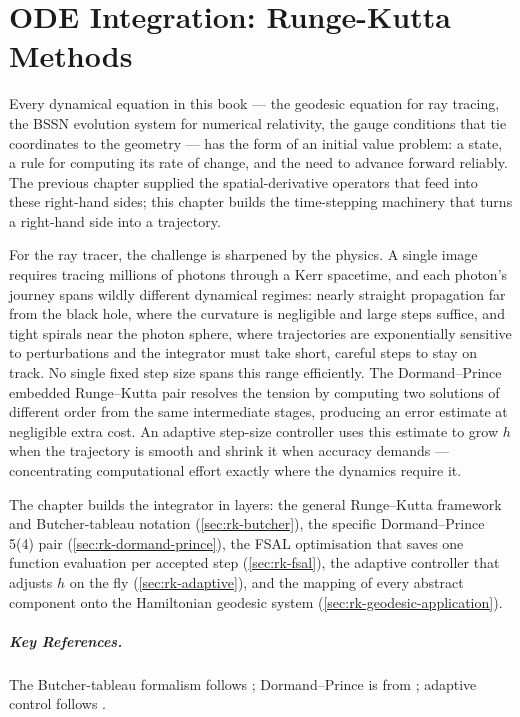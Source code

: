 \chapter{ODE Integration: Runge-Kutta Methods}
\label{ch:ode-integration}

Every dynamical equation in this book --- the geodesic equation for ray
tracing, the BSSN evolution system for numerical relativity, the gauge
conditions that tie coordinates to the geometry --- has the form of an
initial value problem: a state, a rule for computing its rate of change,
and the need to advance forward reliably.  The previous chapter supplied
the spatial-derivative operators that feed into these right-hand sides;
this chapter builds the time-stepping machinery that turns a right-hand
side into a trajectory.

For the ray tracer, the challenge is sharpened by the physics.  A single
image requires tracing millions of photons through a Kerr spacetime, and
each photon's journey spans wildly different dynamical regimes: nearly
straight propagation far from the black hole, where the curvature is
negligible and large steps suffice, and tight spirals near the photon
sphere, where trajectories are exponentially sensitive to perturbations
and the integrator must take short, careful steps to stay on track.  No
single fixed step size spans this range efficiently.  The Dormand--Prince
embedded Runge--Kutta pair resolves the tension by computing two solutions
of different order from the same intermediate stages, producing an error
estimate at negligible extra cost.  An adaptive step-size controller uses
this estimate to grow $h$ when the trajectory is smooth and shrink it
when accuracy demands --- concentrating computational effort exactly
where the dynamics require it.

The chapter builds the integrator in layers: the general Runge--Kutta
framework and Butcher-tableau notation (\cref{sec:rk-butcher}), the
specific Dormand--Prince 5(4) pair (\cref{sec:rk-dormand-prince}), the
FSAL optimisation that saves one function evaluation per accepted step
(\cref{sec:rk-fsal}), the adaptive controller that adjusts $h$ on the
fly (\cref{sec:rk-adaptive}), and the mapping of every abstract
component onto the Hamiltonian geodesic system
(\cref{sec:rk-geodesic-application}).











\paragraph{Key References.}
The Butcher-tableau formalism follows \cite{HairerNorsettWanner1993};
Dormand--Prince is from \cite{DormandPrince1980}; adaptive control follows
\cite{HairerWanner1996}.
